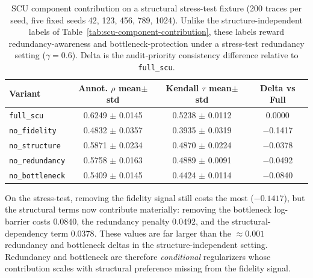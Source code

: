 \documentclass[a4paper,fleqn]{cas-sc}
\begin{document}
\begin{table}[ht]
\caption{SCU component contribution on a structural stress-test fixture (200 traces per seed, five fixed seeds 42, 123, 456, 789, 1024). Unlike the structure-independent labels of Table~\ref{tab:scu-component-contribution}, these labels reward redundancy-awareness and bottleneck-protection under a stress-test redundancy setting ($\gamma=0.6$). Delta is the audit-priority consistency difference relative to \texttt{full\_scu}.}
\label{tab:scu-stress-test}
\centering
\small
\renewcommand{\arraystretch}{1.08}
\begin{tabular}{lccc}
\toprule
\textbf{Variant} & \textbf{Annot. $\rho$ mean$\pm$std} & \textbf{Kendall $\tau$ mean$\pm$std} & \textbf{Delta vs Full} \\
\midrule
\texttt{full\_scu} & 0.6249 $\pm$ 0.0145 & 0.5238 $\pm$ 0.0112 & 0.0000 \\
\texttt{no\_fidelity} & 0.4832 $\pm$ 0.0357 & 0.3935 $\pm$ 0.0319 & $-$0.1417 \\
\texttt{no\_structure} & 0.5871 $\pm$ 0.0234 & 0.4870 $\pm$ 0.0224 & $-$0.0378 \\
\texttt{no\_redundancy} & 0.5758 $\pm$ 0.0163 & 0.4889 $\pm$ 0.0091 & $-$0.0492 \\
\texttt{no\_bottleneck} & 0.5409 $\pm$ 0.0145 & 0.4424 $\pm$ 0.0114 & $-$0.0840 \\
\bottomrule
\end{tabular}
\end{table}

On the stress-test, removing the fidelity signal still costs the most ($-0.1417$), but the structural terms now contribute materially: removing the bottleneck log-barrier costs $0.0840$, the redundancy penalty $0.0492$, and the structural-dependency term $0.0378$. These values are far larger than the $\approx 0.001$ redundancy and bottleneck deltas in the structure-independent setting. Redundancy and bottleneck are therefore \emph{conditional} regularizers whose contribution scales with structural preference missing from the fidelity signal.
\end{document}
